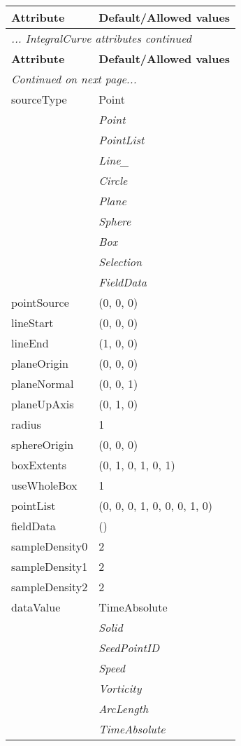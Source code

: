 \documentclass[10pt,a4paper]{report}
\begin{document}
\begin{longtable}{ll}
{\bf Attribute} & {\bf Default/Allowed values} \\
\hline \hline
\endfirsthead
\multicolumn{2}{l}{{\it ... IntegralCurve attributes continued}} \\
{\bf Attribute} & {\bf Default/Allowed values} \\
\hline \hline
\endhead
\hline
\multicolumn{2}{l}{{\it Continued on next page...}} \\
\endfoot
\hline
\endlastfoot

sourceType  &  Point   \\
 & {\it  Point} \\
 & {\it  PointList} \\
 & {\it  Line\_} \\
 & {\it  Circle} \\
 & {\it  Plane} \\
 & {\it  Sphere} \\
 & {\it  Box} \\
 & {\it  Selection} \\
 & {\it  FieldData} \\
pointSource  &  (0, 0, 0) \\
lineStart  &  (0, 0, 0) \\
lineEnd  &  (1, 0, 0) \\
planeOrigin  &  (0, 0, 0) \\
planeNormal  &  (0, 0, 1) \\
planeUpAxis  &  (0, 1, 0) \\
radius  &  1 \\
sphereOrigin  &  (0, 0, 0) \\
boxExtents  &  (0, 1, 0, 1, 0, 1) \\
useWholeBox  &  1 \\
pointList  &  (0, 0, 0, 1, 0, 0, 0, 1, 0) \\
fieldData  &  () \\
sampleDensity0  &  2 \\
sampleDensity1  &  2 \\
sampleDensity2  &  2 \\
dataValue  &  TimeAbsolute   \\
 & {\it  Solid} \\
 & {\it  SeedPointID} \\
 & {\it  Speed} \\
 & {\it  Vorticity} \\
 & {\it  ArcLength} \\
 & {\it  TimeAbsolute} \\

\end{longtable}
\end{document}
